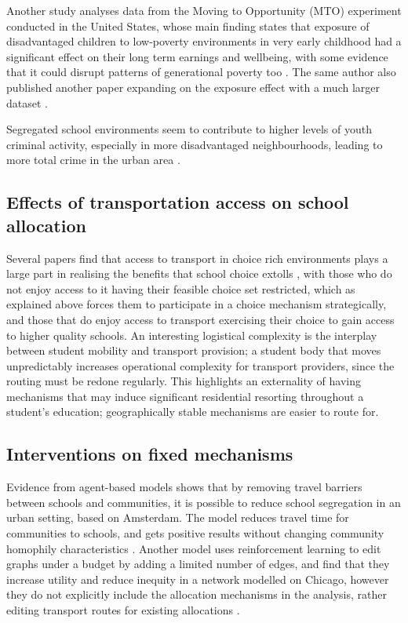 \documentclass{article}
\begin{document}
\begin{multicols}{2}
Another study analyses data from the Moving to Opportunity (MTO) experiment conducted in the United States, whose main finding states that exposure of disadvantaged children to low-poverty environments in very early childhood had a significant effect on their long term earnings and wellbeing, with some evidence that it could disrupt patterns of generational poverty too \cite{chettyEffectsExposureBetter2016}. The same author also published another paper expanding on the exposure effect with a much larger dataset \cite{chettyImpactsNeighborhoodsIntergenerational2018}.

Segregated school environments seem to contribute to higher levels of youth criminal activity, especially in more disadvantaged neighbourhoods, leading to more total crime in the urban area \cite{billingsPartnersCrime2019}.

\subsection{Effects of transportation access on school allocation}
Several papers find that access to transport in choice rich environments plays a large part in realising the benefits that school choice extolls \cite{sattin-bajajStudentTransportationChoiceRich2023,trajkovskiSchoolBusesMake2021,cordesDoesPupilTransportation2018}, with those who do not enjoy access to it having their feasible choice set restricted, which as explained above forces them to participate in a choice mechanism strategically, and those that do enjoy access to transport exercising their choice to gain access to higher quality schools. An interesting logistical complexity is the interplay between student mobility and transport provision; a student body that moves unpredictably increases operational complexity for transport providers, since the routing must be redone regularly. This highlights an externality of having mechanisms that may induce significant residential resorting throughout a student's education; geographically stable mechanisms are easier to route for.

\subsection{Interventions on fixed mechanisms}
Evidence from agent-based models shows that by removing travel barriers between schools and communities, it is possible to reduce school segregation in an urban setting, based on Amsterdam. The model reduces travel time for communities to schools, and gets positive results without changing community homophily characteristics \cite{michailidisTacklingSchoolSegregation2024}. Another model uses reinforcement learning to edit graphs under a budget by adding a limited number of edges, and find that they increase utility and reduce inequity in a network modelled on Chicago, however they do not explicitly include the allocation mechanisms in the analysis, rather editing transport routes for existing allocations \cite{ramachandranGAEAGraphAugmentation2021}.


\end{multicols}
\end{document}
